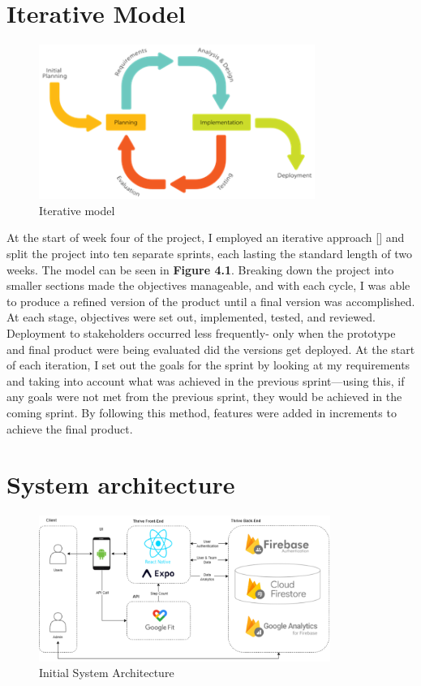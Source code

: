 \documentclass{l4proj}
\begin{document}
\section{Iterative Model}
  \begin{figure}[h]
    \centering
     \includegraphics[width=90mm]{dissertation/images/3.png}
     \caption{Iterative model}
     \setlength{\belowcaptionskip}{-10pt}
     \label{fig: Forms of exercise}
 \end{figure}
At the start of week four of the project, I employed an iterative approach [] and split the project into ten separate sprints, each lasting the standard length of two weeks. The model can be seen in \textbf{Figure 4.1}.
 Breaking down the project into smaller sections made the objectives manageable, and with each cycle, I was able to produce a refined version of the product until a final version was accomplished. At each stage, objectives were set out, implemented, tested, and reviewed. Deployment to stakeholders occurred less frequently- only when the prototype and final product were being evaluated did the versions get deployed.
At the start of each iteration, I set out the goals for the sprint by looking at my requirements and taking into account what was achieved in the previous sprint—using this, if any goals were not met from the previous sprint, they would be achieved in the coming sprint. By following this method, features were added in increments to achieve the final product. 



\section{System architecture}

  \begin{figure}[h]
    \centering
     \includegraphics[width=95mm]{dissertation/images/4.png}
     \caption{Initial System Architecture}
     \setlength{\belowcaptionskip}{-10pt}
     \label{fig: Forms of exercise}
 \end{figure}
\end{document}
